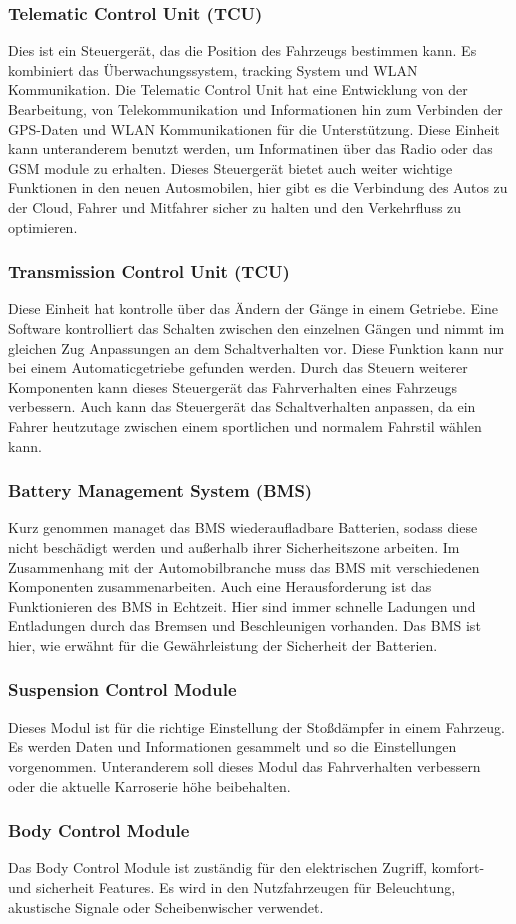         \subsubsection{Telematic Control Unit (TCU)}
        Dies ist ein Steuergerät, das die Position des Fahrzeugs bestimmen kann. Es kombiniert das Überwachungssystem,
        tracking System und WLAN Kommunikation. Die Telematic Control Unit hat eine Entwicklung von der Bearbeitung, von
        Telekommunikation und Informationen hin zum Verbinden der GPS-Daten und WLAN Kommunikationen für die Unterstützung.
        Diese Einheit kann unteranderem benutzt werden, um Informatinen über das Radio oder das GSM module zu erhalten.
        Dieses Steuergerät bietet auch weiter wichtige Funktionen in den neuen Autosmobilen, hier gibt es die Verbindung
        des Autos zu der Cloud, Fahrer und Mitfahrer sicher zu halten und den Verkehrfluss zu optimieren.

        \subsubsection{Transmission Control Unit (TCU)}
        Diese Einheit hat kontrolle über das Ändern der Gänge in einem Getriebe. Eine Software kontrolliert das Schalten
        zwischen den einzelnen Gängen und nimmt im gleichen Zug Anpassungen an dem Schaltverhalten vor. Diese Funktion kann
        nur bei einem Automaticgetriebe gefunden werden. Durch das Steuern weiterer Komponenten kann dieses Steuergerät das
        Fahrverhalten eines Fahrzeugs verbessern. Auch kann das Steuergerät das Schaltverhalten anpassen, da ein Fahrer
        heutzutage zwischen einem sportlichen und normalem Fahrstil wählen kann.

        \subsubsection{Battery Management System (BMS)}
        Kurz genommen managet das BMS wiederaufladbare Batterien, sodass diese nicht beschädigt werden und außerhalb ihrer
        Sicherheitszone arbeiten. Im Zusammenhang mit der Automobilbranche muss das BMS mit verschiedenen Komponenten
        zusammenarbeiten. Auch eine Herausforderung ist das Funktionieren des BMS in Echtzeit. Hier sind immer schnelle
        Ladungen und Entladungen durch das Bremsen und Beschleunigen vorhanden. Das BMS ist hier, wie erwähnt für die
        Gewährleistung der Sicherheit der Batterien.

        \subsubsection{Suspension Control Module}
        Dieses Modul ist für die richtige Einstellung der Stoßdämpfer in einem Fahrzeug. Es werden Daten und Informationen
        gesammelt und so die Einstellungen vorgenommen. Unteranderem soll dieses Modul das Fahrverhalten verbessern oder
        die aktuelle Karroserie höhe beibehalten.

        \subsubsection{Body Control Module}
        Das Body Control Module ist zuständig für den elektrischen Zugriff, komfort- und sicherheit Features. Es wird in
        den Nutzfahrzeugen für Beleuchtung, akustische Signale oder Scheibenwischer verwendet.